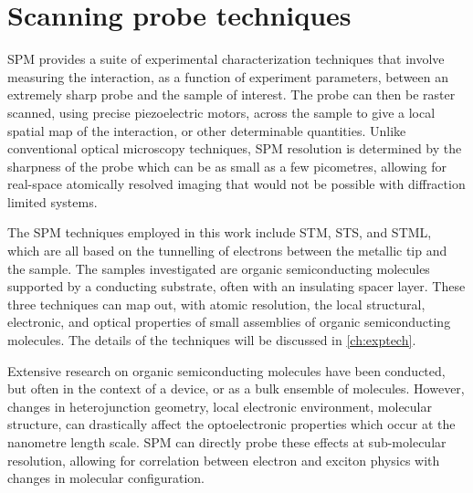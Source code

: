 \section{Scanning probe techniques}


\Acf{SPM} provides a suite of experimental characterization techniques that involve measuring the interaction, as a function of experiment parameters, between an extremely sharp probe and the sample of interest. The probe can then be raster scanned, using precise piezoelectric motors, across the sample to give a local spatial map of the interaction, or other determinable quantities. Unlike conventional optical microscopy techniques, \ac{SPM} resolution is determined by the sharpness of the probe which can be as small as a few picometres, allowing for real-space atomically resolved imaging that would not be possible with diffraction limited systems.

The \ac{SPM} techniques employed in this work include \ac{STM}, \ac{STS}, and \ac{STML}, which are all based on the tunnelling of electrons between the metallic tip and the sample. The samples investigated are organic semiconducting molecules supported by a conducting substrate, often with an insulating spacer layer. These three techniques can map out, with atomic resolution, the local structural, electronic, and optical properties of small assemblies of organic semiconducting molecules. The details of the techniques will be discussed in \autoref{ch:exptech}.

Extensive research on organic semiconducting molecules have been conducted, but often in the context of a device, or as a bulk ensemble of molecules. However, changes in heterojunction geometry, local electronic environment, molecular structure, can drastically affect the optoelectronic properties which occur at the nanometre length scale. \ac{SPM} can directly probe these effects at sub-molecular resolution, allowing for correlation between electron and exciton physics with changes in molecular configuration.


